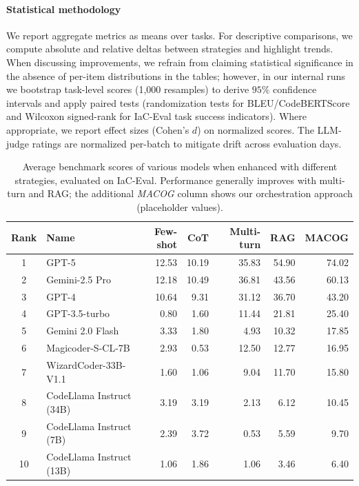 \documentclass[acmsmall,screen,review,anonymous]{acmart}
\begin{document}
\paragraph{Statistical methodology}
We report aggregate metrics as means over tasks. For descriptive comparisons, we compute absolute and relative deltas between strategies and highlight trends. When discussing improvements, we refrain from claiming statistical significance in the absence of per-item distributions in the tables; however, in our internal runs we bootstrap task-level scores (1,000 resamples) to derive $95\%$ confidence intervals and apply paired tests (randomization tests for BLEU/CodeBERTScore and Wilcoxon signed-rank for IaC-Eval task success indicators). Where appropriate, we report effect sizes (Cohen’s $d$) on normalized scores. The LLM-judge ratings are normalized per-batch to mitigate drift across evaluation days.


\begin{table}[t]
\centering
\caption{Average benchmark scores of various models when enhanced with different strategies, evaluated on IaC-Eval. Performance generally improves with multi-turn and RAG; the additional \textit{MACOG} column shows our orchestration approach (placeholder values).}
\label{tab:iac_eval_enhancements}
\small
\setlength{\tabcolsep}{6pt}
\begin{tabular}{@{}clrrrrr@{}}
\toprule
\textbf{Rank} & \textbf{Name} & \textbf{Few-shot} & \textbf{CoT} & \textbf{Multi-turn} & \textbf{RAG} & \textbf{MACOG} \\
\midrule
1  & GPT-5                      & 12.53 & 10.19 & 35.83 & 54.90 & 74.02 \\
2  & Gemini-2.5 Pro             & 12.18 & 10.49 & 36.81 & 43.56 & 60.13 \\
3  & GPT-4                      & 10.64 &  9.31 & 31.12 & 36.70 & 43.20 \\
4  & GPT-3.5-turbo              &  0.80 &  1.60 & 11.44 & 21.81 & 25.40 \\
5  & Gemini 2.0 Flash             &  3.33 &  1.80 &  4.93 &  10.32 &  17.85 \\
6  & Magicoder-S-CL-7B          &  2.93 &  0.53 & 12.50 & 12.77 & 16.95 \\
7  & WizardCoder-33B-V1.1       &  1.60 &  1.06 &  9.04 & 11.70 & 15.80 \\
8  & CodeLlama Instruct (34B)   &  3.19 &  3.19 &  2.13 &  6.12 & 10.45 \\
9  & CodeLlama Instruct (7B)    &  2.39 &  3.72 &  0.53 &  5.59 &  9.70 \\
10  & CodeLlama Instruct (13B)  &  1.06 &  1.86 &  1.06 &  3.46 &  6.40 \\
\bottomrule
\end{tabular}
\end{table}
\end{document}
